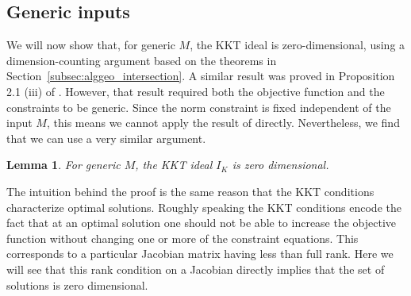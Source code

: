 \documentclass[aps,pra,notitlepage,preprintnumbers,11pt,tightenlines]{revtex4-1}
\newtheorem{lemma}[theorem]{Lemma}
\begin{document}
\subsection{Generic inputs}
We will now show that, for generic $M$, the KKT ideal is
zero-dimensional, using a dimension-counting argument based on the
theorems in Section~\ref{subsec:alggeo_intersection}. A similar result was
proved in Proposition 2.1 (iii) of \cite{nie:2009}. However, that result required both the
objective function and the constraints to be generic. Since the norm
constraint is fixed independent of the input $M$, this means we cannot
apply the result of \cite{nie:2009} directly. Nevertheless, we find that we can use a
very similar argument.

\begin{lemma}
  For generic $M$, the KKT ideal $I_K$ is zero dimensional. 
\end{lemma}

The intuition behind the proof is the same reason that the KKT
conditions characterize optimal solutions.  Roughly speaking the KKT
conditions encode the fact that at an optimal solution one should not
be able to increase the objective function without changing one or
more of the constraint equations.  This corresponds to a particular
Jacobian matrix having less than full rank.  Here we will see that
this rank condition on a Jacobian directly implies that the set of
solutions is zero dimensional.  
\end{document}
